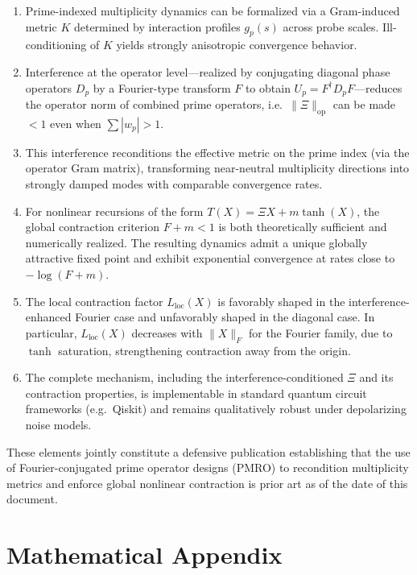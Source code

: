 \documentclass[11pt]{article}
\begin{document}
\begin{enumerate}[label=(\alph*)]
  \item Prime-indexed multiplicity dynamics can be formalized via a Gram-induced metric $K$ determined by interaction profiles $g_p(s)$ across probe scales. Ill-conditioning of $K$ yields strongly anisotropic convergence behavior.

  \item Interference at the operator level---realized by conjugating diagonal phase operators $D_p$ by a Fourier-type transform $F$ to obtain $U_p = F^\dagger D_p F$---reduces the operator norm of combined prime operators, i.e.\ $\|\Xi\|_{\mathrm{op}}$ can be made $<1$ even when $\sum |w_p|>1$.

  \item This interference reconditions the effective metric on the prime index (via the operator Gram matrix), transforming near-neutral multiplicity directions into strongly damped modes with comparable convergence rates.

  \item For nonlinear recursions of the form $T(X)=\Xi X + m\tanh(X)$, the global contraction criterion $F+m<1$ is both theoretically sufficient and numerically realized. The resulting dynamics admit a unique globally attractive fixed point and exhibit exponential convergence at rates close to $-\log(F+m)$.

  \item The local contraction factor $L_{\text{loc}}(X)$ is favorably shaped in the interference-enhanced Fourier case and unfavorably shaped in the diagonal case. In particular, $L_{\text{loc}}(X)$ decreases with $\|X\|_F$ for the Fourier family, due to $\tanh$ saturation, strengthening contraction away from the origin.

  \item The complete mechanism, including the interference-conditioned $\Xi$ and its contraction properties, is implementable in standard quantum circuit frameworks (e.g.\ Qiskit) and remains qualitatively robust under depolarizing noise models.
\end{enumerate}

These elements jointly constitute a defensive publication establishing that the use of Fourier-conjugated prime operator designs (PMRO) to recondition multiplicity metrics and enforce global nonlinear contraction is prior art as of the date of this document.

\appendix
\section*{Mathematical Appendix}
\end{document}
